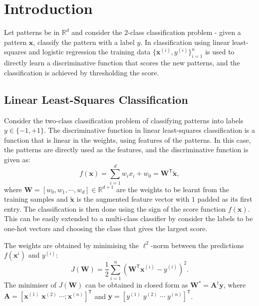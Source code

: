 \documentclass[12pt, a4 paper]{article}
\newcommand{\by}{\mathbf{y}}
\newcommand{\bx}{\mathbf{x}}
\newcommand{\bW}{\mathbf{W}}
\newcommand{\bA}{\mathbf{A}}
\newcommand{\rr}{\mathbb{R}}
\newcommand{\TT}{\mathsf{T}}
\begin{document}




\section*{Introduction}
\label{sec:intro}

Let patterns be in $\rr^{d}$ and consider the $2$-class classification problem - given a pattern $\bx$, classify the pattern with a label $y$. In classification using linear least-squares and logistic regression the training data $\{\bx^{(i)}, y^{(i)}\}_{i=1}^{n}$ is used to directly learn a discriminative function that scores the new patterns, and the classification is achieved by thresholding the score.


\subsection*{Linear Least-Squares Classification}
\label{subsec:linearRegression}

Consider the two-class classification problem of classifying patterns into labels $y \in \{-1, +1\}$. The discriminative function in linear least-squares classification is a function that is linear in the weights, using features of the patterns. In this case, the patterns are directly used as the features, and the discriminative function is given as:
\begin{equation}
	f(\bx) = \sum_{i=1}^{d} w_{i} x_{i} + w_{0} = \bW^{\TT} \tilde{\bx},
\label{eq:linearDiscriminator}
\end{equation}
where $\bW = [w_{0}, w_{1}, \cdots, w_{d}] \in \rr^{d+1}$ are the weights to be learnt from the training samples and $\tilde{\bx}$ is the augmented feature vector with $1$ padded as its first entry. The classification is then done using the sign of the score function $f(\bx)$. This can be easily extended to a multi-class classifier by consider the labels to be one-hot vectors and choosing the class that gives the largest score.

The weights are obtained by minimising the $\ell^{2}$-norm between the predictions $f(\bx^{i})$ and $y^{(i)}$:
\begin{equation}
	J(\bW) = \frac{1}{2} \sum_{i=1}^{n} \left( \bW^{\TT}\bx^{(i)} - y^{(i)} \right)^{2}.
\label{eq:lsClassifier}
\end{equation}
The minimiser of $J(\bW)$ can be obtained in closed form as $\bW^{*} = \bA^{\dagger} \by$, where $\bA = [\bx^{(1)} \; \bx^{(2)} \; \cdots ; \bx^{(n)}]^{\TT}$ and $\by = [y^{(1)} \; y^{(2)} \; \cdots \; y^{(n)}]^{\TT}$.
\end{document}
